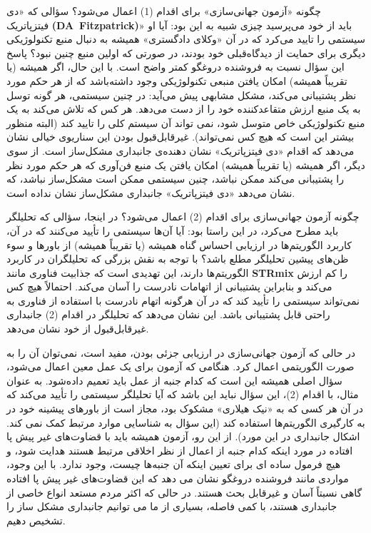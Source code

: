 چگونه «آزمون جهانی‌سازی» برای اقدام (1) اعمال می‌شود؟ سؤالی که «دی فیتزپاتریک \textenglish{\textbf{\mbox{(DA Fitzpatrick)}}}» باید از خود می‌پرسید چیزی شبیه به این بود: آیا او سیستمی را تایید می‌کرد که در آن «وکلای دادگستری» همیشه به دنبال منبع تکنولوژیکی دیگری برای حمایت از دیدگاه‌قبلی خود بودند، در صورتی که اولین منبع چنین نبود؟ پاسخ این سؤال نسبت به فروشنده دروغگو کمتر واضح است.
با این حال، اگر همیشه (یا تقریباً همیشه) امکان یافتن منبعی تکنولوژیکی وجود داشته‌باشد که از هر حکم مورد نظر پشتیبانی می‌کند، مشکل مشابهی پیش می‌آید: در چنین سیستمی، هر گونه توسل به یک منبع ارزش متقاعدکننده خود را از دست می‌دهد.
هر کس که تلاش می‌کند به یک منبع تکنولوژیکی خاص متوسل شود، نمی تواند آن سیستم کلی را تایید کند (البته منظور بیشتر این است که هیچ کس نمی‌تواند).
غیرقابل‌قبول بودن این سناریوی خیالی نشان می‌دهد که اقدام «دی فیتزپاتریک» نشان دهنده‌ی جانبداری مشکل‌ساز است.
از سوی دیگر، اگر همیشه (یا تقریباً همیشه) امکان یافتن یک منبع فن‌آوری که هر حکم مورد نظر را پشتیبانی می‌کند ممکن نباشد، چنین سیستمی ممکن است مشکل‌ساز نباشد، که نشان می‌دهد «دی فیتزپاتریک» جانبداری مشکل‌ساز نشان نداده است.

چگونه آزمون جهانی‌سازی برای اقدام (2) اعمال می‌شود؟ در اینجا، سؤالی که تحلیلگر باید مطرح می‌کرد، در این راستا بود: آیا آن‌ها سیستمی را تأیید می‌کنند که در آن، کاربرد الگوریتم‌ها در ارزیابی احساس گناه همیشه (یا تقریباً همیشه) از باورها و سوء ظن‌های پیشین تحلیلگر مطلع باشد؟ با توجه به نقش بزرگی که تحلیلگران در کاربرد الگوریتم‌ها دارند، این تهدیدی است که جذابیت فناوری مانند \textenglish{\textbf{STRmix}} را کم ارزش می‌کند و بنابراین پشتیبانی از اتهامات نادرست را آسان می‌کند.
احتمالاً هیچ کس نمی‌تواند سیستمی را تأیید کند که در آن هرگونه اتهام نادرست با استفاده از فناوری به راحتی قابل پشتیبانی باشد.
این نشان می‌دهد که تحلیلگر در اقدام (2) جانبداری غیرقابل‌قبول از خود نشان می‌دهد.

در حالی که آزمون جهانی‌سازی در ارزیابی جزئی بودن، مفید است، نمی‌توان آن را به صورت الگوریتمی اعمال کرد.
هنگامی که آزمون برای یک عمل معین اعمال می‌شود، سؤال اصلی همیشه این است که کدام جنبه از عمل باید تعمیم داده‌شود.
به عنوان مثال، با اقدام (2)، این سؤال نباید این باشد که آیا تحلیلگر سیستمی را تأیید می‌کند که در آن هر کسی که به «نیک هیلاری» مشکوک بود، مجاز است از باورهای پیشینه خود در به کارگیری الگوریتم‌ها استفاده کند (این سؤال به شناسایی موارد مرتبط کمک نمی کند.
اشکال جانبداری در این مورد).
از این رو، آزمون همیشه باید با قضاوت‌های غیر پیش پا افتاده در مورد اینکه کدام جنبه از اعمال از نظر اخلاقی مرتبط هستند هدایت شود، و هیچ فرمول ساده ای برای تعیین اینکه آن جنبه‌ها چیست، وجود ندارد.
با این وجود، مواردی مانند فروشنده دروغگو نشان می دهد که این قضاوت‌های غیر پیش پا افتاده گاهی نسبتاً آسان و غیرقابل بحث هستند.
در حالی که اکثر مردم مستعد انواع خاصی از جانبداری هستند، با کمی فاصله، بسیاری از ما می توانیم جانبداری مشکل ساز را تشخیص دهیم.






